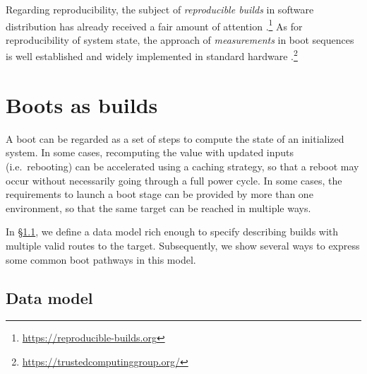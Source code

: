 Regarding reproducibility, the subject of \emph{reproducible builds} in software distribution has already received a fair amount of attention \cite{lamb:hal-03196519}.\footnote{\url{https://reproducible-builds.org}}
%
As for reproducibility of system state, the approach of \emph{measurements} in boot sequences is well established and widely implemented in standard hardware \cite{kinney2006trusted}.\footnote{\url{https://trustedcomputinggroup.org/}}
  
\begin{comment}
TODO
  The latter is clearly related in spirit to the idea of \emph{immutable infrastructure}.
  This term is commonly used to refer to the phoenix server model,\footnote{} where servers are redeployed from scratch --- in particular, including a power cycle --- whenever an upgrade is requested.
  If deployments from scratch are reproducible, then this system ensures that upgrades are reproducible too.

  But for a deployment to be reproducible, every stage of the deployment should also be reproducible; with a suitable system for caching intermediate states that remain invariant on an upgrade, reproducibility can be achieved without a phoenix server model.
\end{comment}

\section{Boots as builds} \label{build}

A boot can be regarded as a set of steps to compute the state of an initialized system. 
%
In some cases, recomputing the value with updated inputs (i.e.~rebooting) can be accelerated using a caching strategy, so that a reboot may occur without necessarily going through a full power cycle.
%
In some cases, the requirements to launch a boot stage can be provided by more than one environment, so that the same target can be reached in multiple ways.

In \S\ref{data-model}, we define a data model rich enough to specify describing builds with multiple valid routes to the target.
%
Subsequently, we show several ways to express some common boot pathways in this model.

\subsection{Data model} \label{data-model}

